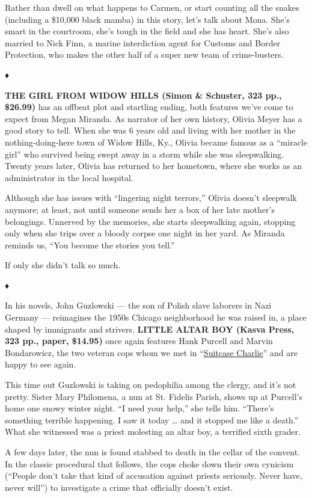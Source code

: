 Rather than dwell on what happens to Carmen, or start counting all the
snakes (including a \$10,000 black mamba) in this story, let's talk
about Mona. She's smart in the courtroom, she's tough in the field and
she has heart. She's also married to Nick Finn, a marine interdiction
agent for Customs and Border Protection, who makes the other half of a
super new team of crime-busters.

♦

\textbf{THE GIRL FROM WIDOW HILLS (Simon \& Schuster, 323 pp., \$26.99)}
has an offbeat plot and startling ending, both features we've come to
expect from Megan Miranda. As narrator of her own history, Olivia Meyer
has a good story to tell. When she was 6 years old and living with her
mother in the nothing-doing-here town of Widow Hills, Ky., Olivia became
famous as a ``miracle girl'' who survived being swept away in a storm
while she was sleepwalking. Twenty years later, Olivia has returned to
her hometown, where she works as an administrator in the local hospital.

Although she has issues with ``lingering night terrors,'' Olivia doesn't
sleepwalk anymore; at least, not until someone sends her a box of her
late mother's belongings. Unnerved by the memories, she starts
sleepwalking again, stopping only when she trips over a bloody corpse
one night in her yard. As Miranda reminds us, ``You become the stories
you tell.''

If only she didn't talk so much.

♦

In his novels, John Guzlowski --- the son of Polish slave laborers in
Nazi Germany --- reimagines the 1950s Chicago neighborhood he was raised
in, a place shaped by immigrants and strivers. \textbf{LITTLE ALTAR BOY
(Kasva Press, 323 pp., paper, \$14.95)} once again features Hank Purcell
and Marvin Bondarowicz, the two veteran cops whom we met in
``\href{https://www.nytimes3xbfgragh.onion/2018/11/30/books/review/louise-penny-kingdom-of-the-blind.html}{Suitcase
Charlie}'' and are happy to see again.

This time out Guzlowski is taking on pedophilia among the clergy, and
it's not pretty. Sister Mary Philomena, a nun at St. Fidelis Parish,
shows up at Purcell's home one snowy winter night. ``I need your help,''
she tells him. ``There's something terrible happening. I saw it today
\ldots{} and it stopped me like a death.'' What she witnessed was a
priest molesting an altar boy, a terrified sixth grader.

A few days later, the nun is found stabbed to death in the cellar of the
convent. In the classic procedural that follows, the cops choke down
their own cynicism (``People don't take that kind of accusation against
priests seriously. Never have, never will'') to investigate a crime that
officially doesn't exist.

